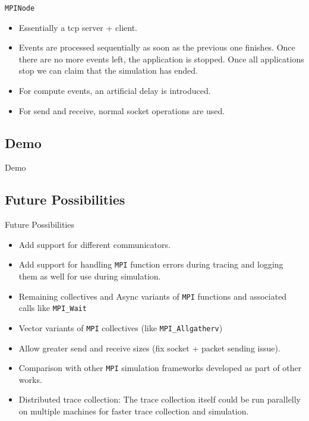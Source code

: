 \documentclass[pdf]{beamer}
\begin{document}
\begin{frame}{\texttt{MPINode}}
  \begin{itemize}
    \item<1-> Essentially a tcp server + client.
    \item<2-> Events are processed sequentially as soon as the previous one
      finishes. Once there are no more events left, the application is
      stopped. Once all applications stop we can claim that the simulation has
      ended.
    \item<3-> For compute events, an artificial delay is introduced.
    \item<4-> For send and receive, normal socket operations are used.
  \end{itemize}
\end{frame}

\subsection{Demo}
\begin{frame}[c]
  \begin{center}
    \Huge Demo
  \end{center}
\end{frame}

\subsection{Future Possibilities}
\begin{frame}{Future Possibilities}
  \begin{itemize}
    \item<1-> Add support for different communicators.
    \item<2-> Add support for handling \texttt{MPI} function errors during
      tracing and logging them as well for use during simulation.
    \item<3-> Remaining collectives and Async variants of \texttt{MPI} functions and
      associated calls like \texttt{MPI\_Wait}
    \item<4-> Vector variants of \texttt{MPI} collectives (like
      \texttt{MPI\_Allgatherv})
    \item<5-> Allow greater send and receive sizes (fix socket + packet sending
      issue).
    \item<6-> Comparison with other \texttt{MPI} simulation frameworks developed as
      part of other works.
    \item<7-> Distributed trace collection: The trace collection itself could be run
      parallelly on multiple machines for faster trace collection and simulation.
  \end{itemize}
\end{frame}
\end{document}

